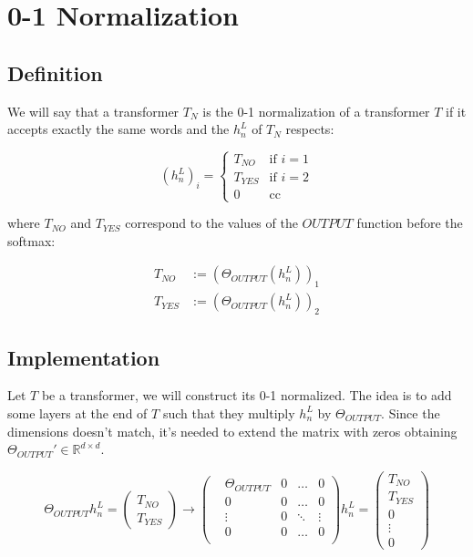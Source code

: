 \section*{0-1 Normalization}

\subsection*{Definition}

We will say that a transformer $T_N$ is the 0-1 normalization of a transformer $T$ if it accepts exactly the same words and the $h_n^L$ of $T_N$ respects:

\begin{equation*}
(h_{n}^L)_i =
\begin{cases}
T_{NO} & \text{if } i = 1 \\
T_{YES} & \text{if } i = 2 \\
0 & \text{cc }
\end{cases}
\end{equation*}

where $T_{NO}$ and $T_{YES}$ correspond to the values of the $OUTPUT$ function before the softmax:

\begin{align*}
    T_{NO} &:= (\Theta_{OUTPUT}(h_n^L))_1 \\
    T_{YES} &:= (\Theta_{OUTPUT}(h_n^L))_2 
\end{align*}


\subsection*{Implementation}

Let $T$ be a transformer, we will construct its 0-1 normalized. The idea is to add some layers at the end of $T$ such that they multiply $h_n^L$ by $\Theta_{OUTPUT}$. Since the dimensions doesn't match, it's needed to extend the matrix with zeros obtaining $\Theta_{OUTPUT}' \in \mathbb{R}^{d\times d}$.


\begin{equation*}
    \Theta_{OUTPUT}h_n^L =   
    \left(\begin{matrix}
        T_{NO} \\
        T_{YES}
    \end{matrix}\right) \longrightarrow
    \left(\begin{matrix}
        &\Theta_{OUTPUT} &0 &\dots  &0 \\
        &0                &0 &\dots  &0 \\
        &\vdots           &0 &\ddots &\vdots \\
        &0                &0 &\dots  &0 \\
    \end{matrix}\right)h_n^L = 
    \left(\begin{matrix}
        T_{NO} \\
        T_{YES} \\ 
        0 \\
        \vdots \\
        0
    \end{matrix}\right)
\end{equation*}


